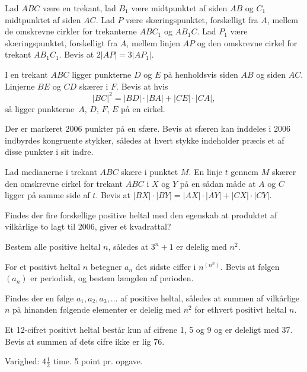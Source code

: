 \documentclass{bw06}
\begin{document}
\begin{problems}
\item  Lad $ABC$ v\ae re en trekant, lad $B_1$ v\ae re midtpunktet af 
siden $AB$ og 
$C_1$ midtpunktet af siden $AC$. Lad $P$ v\ae re sk\ae ringspunktet, 
forskelligt fra $A$, mellem de omskrevne cirkler for trekanterne $ABC_1$ og $AB_1C$. Lad $P_1$ v\ae re sk\ae ringspunktet, 
forskelligt fra $A$, mellem linjen $AP$ og den omskrevne cirkel for trekant $AB_1C_1$. Bevis at $2\lvert AP\rvert =
 3\lvert AP_1\rvert$.

\item  %
I en trekant $ABC$ ligger punkterne $D$ og $E$ p\aa{} henholdsvis siden $AB$ og siden $AC$. Linjerne $BE$ og $CD$ sk\ae rer i $F$. Bevis at hvis
\[\lvert BC\rvert^2=\lvert BD\rvert\cdot \lvert BA\rvert+\lvert CE\rvert\cdot \lvert CA\rvert,\]
s\aa{} ligger punkterne~$A$, $D$, $F$, $E$ p\aa{} en cirkel.

\item  Der er markeret 2006 punkter p\aa{} en sf\ae re. Bevis at sf\ae ren kan inddeles i 2006 indbyrdes kongruente stykker, s\aa ledes at hvert stykke indeholder pr\ae cis et af disse punkter i sit indre.

\item  Lad medianerne i trekant $ABC$ sk\ae re i punktet $M$. En linje $t$ gennem $M$ sk\ae rer den omskrevne cirkel for trekant $ABC$ i $X$ og $Y$ p\aa{} en s\aa dan m\aa de at $A$ og $C$ ligger p\aa{} samme side af $t$. Bevis at $\lvert BX\rvert\cdot\lvert BY\rvert=\lvert AX\rvert\cdot \lvert AY\rvert + \lvert CX\rvert \cdot \lvert CY\rvert$.

\item Findes der fire forskellige positive heltal med den egenskab at produktet af vilk\aa rlige to lagt til 2006, giver et kvadrattal?

\item  %
Bestem alle positive heltal $n$, s\aa ledes at $3^n+1$ er delelig med $n^2$.

\item For et positivt heltal $n$ betegner $a_n$ det sidste ciffer i $n^{(n^n)}$. Bevis at f\o lgen $(a_n)$ er periodisk, og bestem l\ae ngden af perioden.

\item Findes der en f\o lge $a_1,a_2,a_3,\ldots$ af positive heltal, s\aa ledes at summen af vilk\aa rlige $n$ p\aa{} hinanden f\o lgende elementer er delelig med $n^2$ for ethvert positivt heltal $n$.

\item Et 12-cifret positivt heltal best\aa r kun af cifrene 1, 5 og 9 og er deleligt med 37. Bevis at summen af dets cifre ikke er lig 76.

\end{problems}

Varighed: $4\frac{1}{2}$ time. 5 point pr. opgave.
\end{document}
